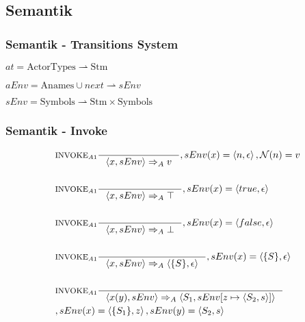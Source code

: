 \subsection{Semantik}
\begin{frame}
	\frametitle{Semantik - Transitions System}
	\begin{center}	
  $at = \text{ActorTypes} \rightharpoonup \text{Stm}$
	
	$aEnv = \text{Anames} \cup {next} \rightharpoonup sEnv$
	
	$sEnv = \text{Symbols} \rightharpoonup \text{Stm} \times \text{Symbols}$
  \end{center}
\end{frame}

\begin{frame}
	\frametitle{Semantik - Invoke}
	\begin{align*}
	&\inference[$\text{INVOKE}_{A1}$]{}
                  {\Braket{x,sEnv} \Rightarrow_A v}
                  {,sEnv(x) = \Braket{n,\epsilon}, \mathcal{N}(n) = v}
	\\\\
	&\inference[$\text{INVOKE}_{A1}$]{}
                  {\Braket{x,sEnv} \Rightarrow_A \top}
                  {,sEnv(x) = \Braket{true,\epsilon}}
	\\\\
	&\inference[$\text{INVOKE}_{A1}$]{}
                  {\Braket{x,sEnv} \Rightarrow_A \bot}
                  {,sEnv(x) = \Braket{false,\epsilon}}
  \\\\
	&\inference[$\text{INVOKE}_{A1}$]{}
                  {\Braket{x,sEnv} \Rightarrow_A \Braket{\{S\},\epsilon}}
                  {,sEnv(x) = \Braket{\{S\},\epsilon}}
	\\\\
	&\inference[$\text{INVOKE}_{A1}$]{}
                  {\Braket{x(y),sEnv} \Rightarrow_A \Braket{S_1,sEnv[z \mapsto \Braket{S_2,s}]}}
                  \\
					        &{,sEnv(x) = \Braket{\{S_1\},z},sEnv(y) = \Braket{S_2,s}}
	\end{align*}
\end{frame}